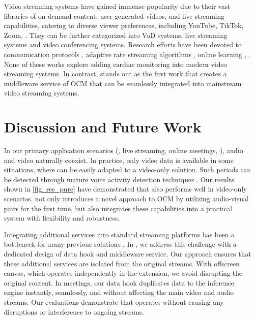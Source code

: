  Video streaming systems have gained immense popularity due to their vast libraries of on-demand content, user-generated videos, and live streaming capabilities, catering to diverse viewer preferences, including YouTube, TikTok, Zoom, \etc. They can be further categorized into VoD systems, live streaming systems and video conferencing systems. Research efforts have been devoted to communication protocols \cite{hamadanian2023ekho, dhawaskar2023converge}, adaptive rate streaming algorithms  \cite{li2023dashlet, wen2023adaptivenet, zhou2019learning}, online learning \cite{tang2023lut, guan2023metastream, khani2023recl, yi2023boosting}, \etc. None of these works explore adding cardiac monitoring into modern video streaming systems. 
In contrast, \sysname stands out as the first work that creates a middleware service of OCM that can be seamlessly integrated into mainstream video streaming systems. 


\section{Discussion and Future Work}

 In our primary application scenarios (\eg, live streaming, online meetings, \etc), audio and video naturally coexist. 
In practice, only video data is available in some situations, where \sysname can be easily adapted to a video-only solution. Such periods can be detected through mature voice activity detection techniques \cite{wiseman2016python}. 
Our results shown in \fig\ref{fig: res_pure} have demonstrated that \sysname also performs well in video-only scenarios. 
\sysname not only introduces a novel approach to OCM by utilizing audio-visual pairs for the first time, but also integrates these capabilities into a practical system with flexibility and robustness.

 Integrating additional services into standard streaming platforms has been a bottleneck for many previous solutions \cite{liu2020grad, mmdetection, du2020server}. In \sysname, we address this challenge with a dedicated design of data hook and middleware service. 
Our approach ensures that these additional services are isolated from the original streams.
With offscreen canvas, which operates independently in the extension, we avoid disrupting the original content. In meetings, our data hook duplicates data to the inference engine instantly, seamlessly, and without affecting the main video and audio streams. Our evaluations demonstrate that \sysname operates without causing any disruptions or interference to ongoing streams.

